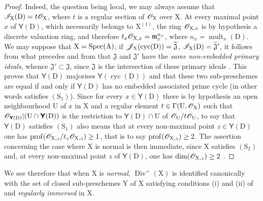 \begin{proof}
Indeed, the question being local, we may always assume that $\mathscr{I}_\mathrm{X}(\mathrm{D})=t\mathscr{O}_\mathrm{X}$, where $t$ is a regular section of $\mathscr{O}_\mathrm{X}$ over $\mathrm{X}$.
At every maximal point $x$ of $\boldsymbol{\mathsf{Y}}(\mathrm{D})$, which necessarily belongs to $\mathrm{X}^{(1)}$, the ring $\mathscr{O}_{\mathrm{X},x}$ is by hypothesis a discrete valuation ring, and therefore $t_x\mathscr{O}_{\mathrm{X},x}=\mathfrak{m}_x^{n_x}$, where $n_x=\operatorname{mult}_x(\mathrm{D})$.
We may suppose that $\mathrm{X}=\operatorname{Spec}(\mathrm{A})$; if $\mathscr{J}_\mathrm{X}(\operatorname{cyc}(\mathrm{D}))=\widetilde{\mathfrak{J}}$, $\mathscr{I}_\mathrm{X}(\mathrm{D})=\widetilde{\mathfrak{J}}'$, it follows from what precedes and from  that $\mathfrak{J}$ and $\mathfrak{J}'$ have the \emph{same non-embedded primary ideals}, whence $\mathfrak{J}'\subset\mathfrak{J}$, since $\mathfrak{J}$ is the intersection of
these primary ideals .
This proves that $\boldsymbol{\mathsf{Y}}(\mathrm{D})$ majorises $\boldsymbol{\mathsf{Y}}(\operatorname{cyc}(\mathrm{D}))$ and that these two sub-preschemes are equal if and only if $\boldsymbol{\mathsf{Y}}(\mathrm{D})$ has no embedded associated prime cycle (in other words satisfies $(\mathrm{S}_1)$).
Since for every $x\in\boldsymbol{\mathsf{Y}}(\mathrm{D})$ there is by hypothesis an open neighbourhood $\mathrm{U}$ of $x$ in $\mathrm{X}$ and a regular element $t\in\Gamma(\mathrm{U},\mathscr{O}_\mathrm{X})$ such that $\mathscr{O}_{\boldsymbol{\mathsf{Y}}(\mathrm{D})}|(\mathrm{U}\cap\boldsymbol{\mathsf{Y}}(\mathrm{D}))$ is the restriction to $\boldsymbol{\mathsf{Y}}(\mathrm{D})\cap\mathrm{U}$ of $\mathscr{O}_\mathrm{U}/t\mathscr{O}_\mathrm{U}$, to say that $\boldsymbol{\mathsf{Y}}(\mathrm{D})$ satisfies $(\mathrm{S}_1)$ also means that at every non-maximal point $z\in\boldsymbol{\mathsf{Y}}(\mathrm{D})$ one has $\operatorname{prof}(\mathscr{O}_{\mathrm{X},z}/t_z\mathscr{O}_{\mathrm{X},z})\geq 1$, that is to say  $\operatorname{prof}(\mathscr{O}_{\mathrm{X},z})\geq 2$.
The assertion concerning the case where $\mathrm{X}$ is normal is then immediate, since $\mathrm{X}$ satisfies $(\mathrm{S}_2)$ and, at every non-maximal point $z$ of $\boldsymbol{\mathsf{Y}}(\mathrm{D})$, one has $\dim(\mathscr{O}_{\mathrm{X},z})\geq 2$ .
\end{proof}

\begin{env}[21.7.3.1]
\label{IV.21.7.3.1}
We see therefore that when $\mathrm{X}$ is \emph{normal}, $\operatorname{Div}^+(\mathrm{X})$ is identified canonically with the set of closed sub-preschemes $\mathrm{Y}$ of $\mathrm{X}$ satisfying conditions (i) and (ii) of  and \emph{regularly immersed} in $\mathrm{X}$.
\end{env}

